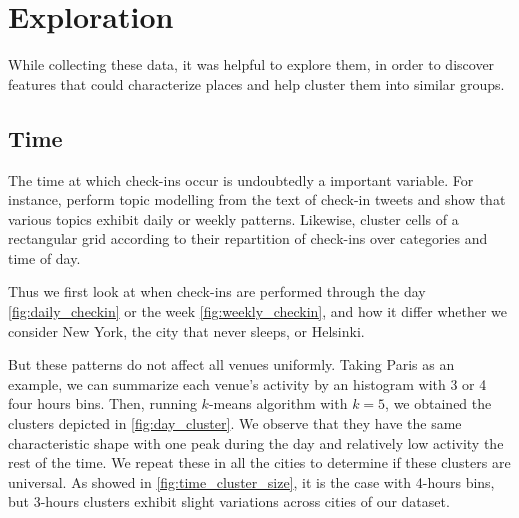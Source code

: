 \section{Exploration}
\label{sec:exploration}

While collecting these data, it was helpful to explore them, in order to
discover features that could characterize places and help cluster them into
similar groups.

\subsection{Time}

The time at which check-ins occur is undoubtedly a important variable. For
instance, \textcite{UrbanStory12} perform topic modelling from the text of
check-in tweets and show that various topics exhibit daily or weekly
patterns. Likewise, \textcite{TimeCluster13} cluster cells of a rectangular
grid according to their repartition of check-ins over categories and time of
day.

Thus we first look at when check-ins are performed through the day
\autoref{fig:daily_checkin} or the week \autoref{fig:weekly_checkin}, and how it
differ whether we consider New York, the city that never sleeps, or Helsinki.

But these patterns do not affect all venues uniformly. Taking Paris as an
example, we can summarize each venue's activity by an histogram with 3 or 4
four hours bins. Then, running $k$-means algorithm with $k=5$, we obtained the
clusters depicted in \autoref{fig:day_cluster}. We observe that they have
the same characteristic shape with one peak during the day and relatively low
activity the rest of the time. We repeat these in all the cities to determine
if these clusters are universal. As showed in \autoref{fig:time_cluster_size},
it is the case with 4-hours bins, but 3-hours clusters exhibit slight
variations across cities of our dataset.

